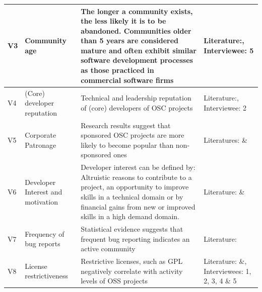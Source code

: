 \documentclass[final,5p,times,twocolumn]{elsarticle}
\begin{document}
\begin{table}
\begin{tabular}{|p{0.5cm}|p{2.5cm}|p{10cm}|p{3.5cm}|}
    
   V3  &                   Community age                              & The longer a community exists, the less likely it is to be abandoned. Communities older than 5 years are considered mature and often exhibit similar software development processes as those practiced in commercial software firms                                                                                                            & Literature:\cite{Samoladas2010}, Interviewee: 5                \\ \hline
    V4  &                   (Core) developer reputation                &    Technical and leadership reputation of (core) developers of OSC projects                                                                                           & Literature:\cite{Immonen2007},  Interviewee: 2            \\ \hline
    V5  &                   Corporate Patronage                        & Research results suggest that sponsored OSC projects are more likely to become popular than non-sponsored ones                                                                    & Literatures:\cite{West2008} \& \cite{Stewart2005} \\ \hline
    V6  &                   Developer Interest and motivation          &                   Developer interest can be defined by:                   Altruistic reasons to contribute to a project,              an opportunity to improve skills in a technical domain or by financial gains from new or improved skills in a high demand domain. & Literature: \cite{Subramaniam2009} \& \cite{Wu2007}   \\ \hline
    V7  &                   Frequency of bug reports                   &                   Statistical evidence suggests that frequent bug reporting indicates an active community                                                                                                                                                                             & Literature: \cite{Raja2006}                      \\ \hline
   V8  &                   License restrictiveness                    & Restrictive licenses, such as GPL negatively correlate with activity levels of OSS projects                                                                                                                                                                                           & Literature: \cite{Stewart2005} \&\cite{Subramaniam2009},  Interviewees: 1, 2, 3, 4 \& 5              \\ \hline

\end{tabular}
\end{table}
\end{document}
